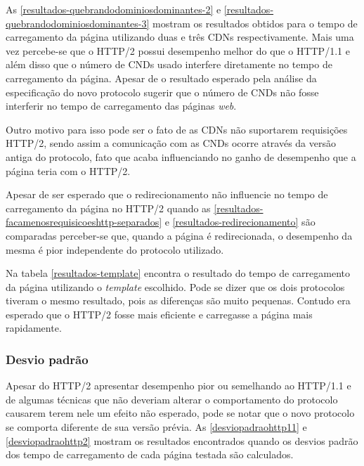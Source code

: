 



As \autoref{resultados-quebrandodominiosdominantes-2} e \autoref{resultados-quebrandodominiosdominantes-3} mostram os resultados obtidos para o tempo de carregamento da página utilizando duas e três CDNs respectivamente. Mais uma vez percebe-se que o HTTP/2 possui desempenho melhor do que o HTTP/1.1 e além disso que o número de CNDs usado interfere diretamente no tempo de carregamento da página. Apesar de o resultado esperado pela análise da especificação do novo protocolo sugerir que o número de CNDs não fosse interferir no tempo de carregamento das páginas \textit{web}.

Outro motivo para isso pode ser o fato de as CDNs não suportarem requisições HTTP/2, sendo assim a comunicação com as CNDs ocorre através da versão antiga do protocolo, fato que acaba influenciando no ganho de desempenho que a página teria com o HTTP/2.



Apesar de ser esperado que o redirecionamento não influencie no tempo de carregamento da página no HTTP/2 quando as \autoref{resultados-facamenosrequisicoeshttp-separados} e \autoref{resultados-redirecionamento} são comparadas perceber-se que, quando a página é redirecionada, o desempenho da mesma é pior independente do protocolo utilizado.



Na tabela \autoref{resultados-template} encontra o resultado do tempo de carregamento da página utilizando o \textit{template} escolhido. Pode se dizer que os dois protocolos tiveram o mesmo resultado, pois as diferenças são muito pequenas. Contudo era esperado que o HTTP/2 fosse mais eficiente e carregasse a página mais rapidamente.

\subsubsection{Desvio padrão}
\label{desviopadrao}

Apesar do HTTP/2 apresentar desempenho pior ou semelhando ao HTTP/1.1 e de algumas técnicas que não deveriam alterar o comportamento do protocolo causarem terem nele um efeito não esperado, pode se notar que o novo protocolo se comporta diferente de sua versão prévia. As \autoref{desviopadraohttp11} e \autoref{desviopadraohttp2} mostram os resultados encontrados quando os desvios padrão dos tempo de carregamento de cada página testada são calculados.

